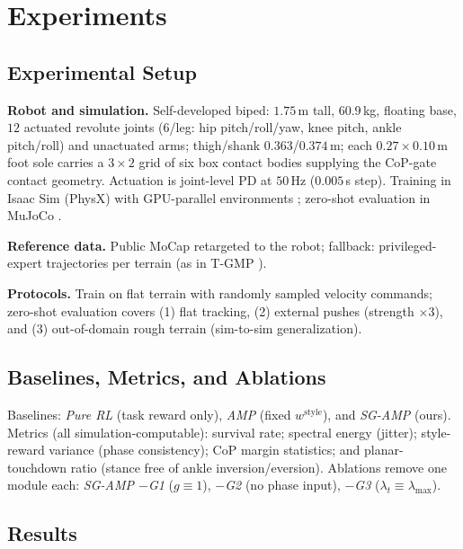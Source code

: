 \documentclass[conference]{IEEEtran}
\begin{document}
\section{Experiments}
\label{sec:experiments}

\subsection{Experimental Setup}
\label{subsec:setup}

\textbf{Robot and simulation.} Self-developed biped: $1.75$\,m tall, $60.9$\,kg, floating base, $12$ actuated revolute joints ($6$/leg: hip pitch/roll/yaw, knee pitch, ankle pitch/roll) and unactuated arms; thigh/shank $0.363$/$0.374$\,m; each $0.27\times0.10$\,m foot sole carries a $3\times2$ grid of six box contact bodies supplying the CoP-gate contact geometry. Actuation is joint-level PD at $50$\,Hz ($0.005$\,s step). Training in Isaac Sim (PhysX) \cite{mittal2023isaaclab} with GPU-parallel environments \cite{makoviychuk2021isaacgym}; zero-shot evaluation in MuJoCo \cite{todorov2012mujoco}.

\textbf{Reference data.} Public MoCap retargeted to the robot; fallback: privileged-expert trajectories per terrain (as in T-GMP \cite{guo2026tgmp}).

\textbf{Protocols.} Train on flat terrain with randomly sampled velocity commands; zero-shot evaluation covers (1) flat tracking, (2) external pushes (strength $\times3$), and (3) out-of-domain rough terrain (sim-to-sim generalization).

\subsection{Baselines, Metrics, and Ablations}

Baselines: \emph{Pure RL} (task reward only), \emph{AMP} \cite{peng2021amp} (fixed $w^{\mathrm{style}}$), and \emph{SG-AMP} (ours). Metrics (all simulation-computable): survival rate; spectral energy (jitter); style-reward variance (phase consistency); CoP margin statistics; and planar-touchdown ratio (stance free of ankle inversion/eversion). Ablations remove one module each: \emph{SG-AMP $-$G1} ($g\equiv1$), \emph{$-$G2} (no phase input), \emph{$-$G3} ($\lambda_t\equiv\lambda_{\max}$).

\subsection{Results}
\label{subsec:results}
\end{document}
